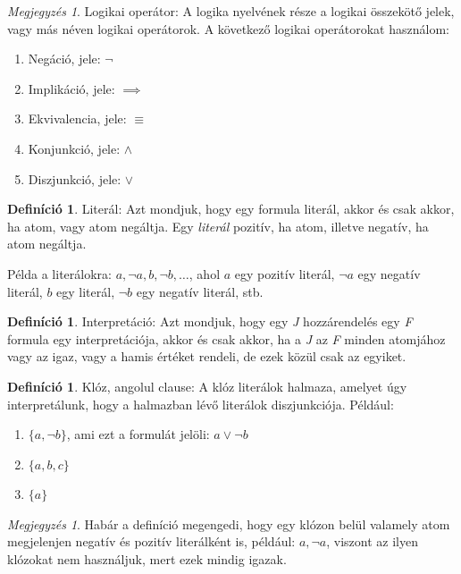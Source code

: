 \documentclass[
]{thesis-ekf}
\theoremstyle{definition}
\newtheorem{definicio}[tetel]{Definíció}
\theoremstyle{remark}
\newtheorem{megjegyzes}[tetel]{Megjegyzés}
\begin{document}
\begin{megjegyzes}
	Logikai operátor: A logika nyelvének része a logikai összekötő jelek, vagy más néven logikai operátorok. A következő logikai operátorokat használom:
	\begin{enumerate}
		\item Negáció, jele: $ \neg $
		\item Implikáció, jele: $ \implies $
		\item Ekvivalencia, jele: $ \equiv $
		\item Konjunkció, jele: $ \wedge $
		\item Diszjunkció, jele: $ \vee $
	\end{enumerate}
\end{megjegyzes}

\begin{definicio}
	Literál: Azt mondjuk, hogy egy formula literál, akkor és csak akkor, ha atom, vagy atom negáltja. Egy \emph{literál} pozitív, ha atom, illetve negatív, ha atom negáltja. 
\end{definicio}

	Példa a literálokra: $ a,\neg a,b,\neg b,\dots $, ahol $a$ egy pozitív literál, $\neg a$ egy negatív literál, $b$ egy literál, $\neg b$ egy negatív literál, stb.

\begin{definicio}
	Interpretáció: Azt mondjuk, hogy egy \emph{J} hozzárendelés egy \emph{F} formula egy interpretációja, akkor és csak akkor, ha a \emph{J} az \emph{F} minden atomjához vagy az igaz, vagy a hamis értéket rendeli, de ezek közül csak az egyiket.
\end{definicio}

\begin{definicio}
	Klóz, angolul clause: A klóz literálok halmaza, amelyet úgy interpretálunk, hogy a halmazban lévő literálok diszjunkciója. Például:
	\begin{enumerate}
		\item $ \{a,\neg b\} $, ami ezt a formulát jelöli: $ a\vee\neg b$
		\item $ \{a,b,c\} $
		\item $ \{a\} $
	\end{enumerate}
\end{definicio}

\begin{megjegyzes}
	Habár a definíció megengedi, hogy egy klózon belül valamely atom megjelenjen negatív és pozitív literálként is, például: $ {a,\neg a}$, viszont az ilyen klózokat nem használjuk, mert ezek mindig igazak.
\end{megjegyzes}
\end{document}
